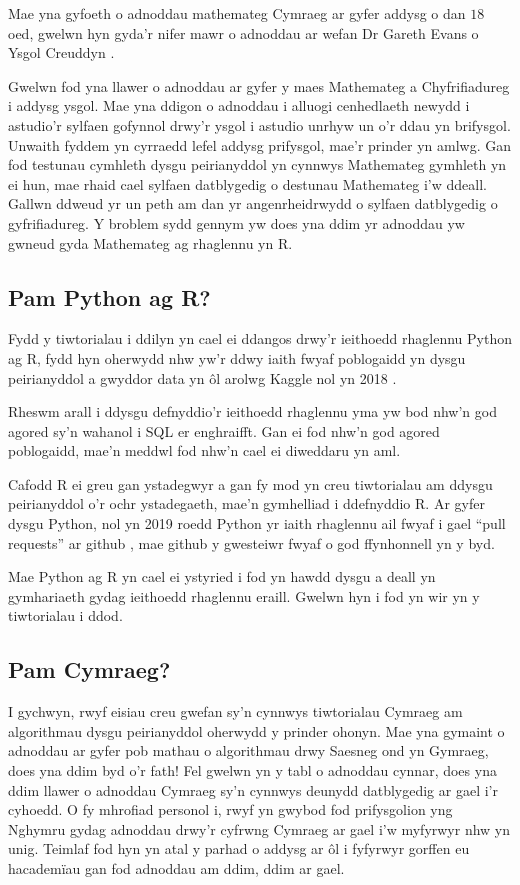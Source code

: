 Mae yna gyfoeth o adnoddau mathemateg Cymraeg ar gyfer addysg o dan $18$ oed, gwelwn hyn gyda'r nifer mawr o adnoddau ar wefan Dr Gareth Evans o Ysgol Creuddyn \cite{mathemateg}.  

Gwelwn fod yna llawer o adnoddau ar gyfer y maes Mathemateg a Chyfrifiadureg i addysg ysgol. Mae yna ddigon o adnoddau i alluogi cenhedlaeth newydd i astudio'r sylfaen gofynnol drwy'r ysgol i astudio unrhyw un o'r ddau yn brifysgol. Unwaith fyddem yn cyrraedd lefel addysg prifysgol, mae'r prinder yn amlwg. Gan fod testunau cymhleth dysgu peirianyddol yn cynnwys Mathemateg gymhleth yn ei hun, mae rhaid cael sylfaen datblygedig o destunau Mathemateg i'w ddeall. Gallwn ddweud yr un peth am dan yr angenrheidrwydd o sylfaen datblygedig o gyfrifiadureg. Y broblem sydd gennym yw does yna ddim yr adnoddau yw gwneud gyda Mathemateg ag rhaglennu yn R.

\subsection{Pam Python ag R?}

Fydd y tiwtorialau i ddilyn yn cael ei ddangos drwy'r ieithoedd rhaglennu Python ag R, fydd hyn oherwydd nhw yw'r ddwy iaith fwyaf poblogaidd yn dysgu peirianyddol a gwyddor data yn \^{o}l arolwg Kaggle nol yn 2018 \cite{kagglesurvey}.

Rheswm arall i ddysgu defnyddio'r ieithoedd rhaglennu yma yw bod nhw'n god agored sy'n wahanol i SQL er enghraifft. Gan ei fod nhw'n god agored poblogaidd, mae'n meddwl fod nhw'n cael ei diweddaru yn aml.

Cafodd R ei greu gan ystadegwyr a gan fy mod yn creu tiwtorialau am ddysgu peirianyddol o'r ochr ystadegaeth, mae'n gymhelliad i ddefnyddio R. Ar gyfer dysgu Python, nol yn 2019 roedd Python yr iaith rhaglennu ail fwyaf i gael ``pull requests'' ar github \cite{canran-github}, mae github y gwesteiwr fwyaf o god ffynhonnell yn y byd.  

Mae Python ag R yn cael ei ystyried i fod yn hawdd dysgu a deall yn gymhariaeth gydag ieithoedd rhaglennu eraill. Gwelwn hyn i fod yn wir yn y tiwtorialau i ddod. 

\subsection{Pam Cymraeg?}

I gychwyn, rwyf eisiau creu gwefan sy'n cynnwys tiwtorialau Cymraeg am algorithmau dysgu peirianyddol oherwydd y prinder ohonyn. Mae yna gymaint o adnoddau ar gyfer pob mathau o algorithmau drwy Saesneg ond yn Gymraeg, does yna ddim byd o'r fath! Fel gwelwn yn y tabl o adnoddau cynnar, does yna ddim llawer o adnoddau Cymraeg sy'n cynnwys deunydd datblygedig ar gael i'r cyhoedd. O fy mhrofiad personol i, rwyf yn gwybod fod prifysgolion yng Nghymru gydag adnoddau drwy'r cyfrwng Cymraeg ar gael i'w myfyrwyr nhw yn unig. Teimlaf fod hyn yn atal y parhad o addysg ar \^{o}l i fyfyrwyr gorffen eu hacadem\"{i}au gan fod adnoddau am ddim, ddim ar gael.

